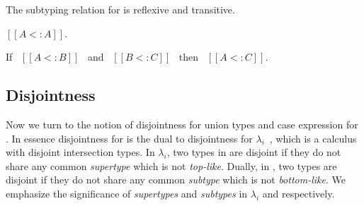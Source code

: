 The subtyping relation for \cal is reflexive and transitive.
\begin{lemma}
  $[[A <: A]]$.
\label{lemma:union:refl}
\end{lemma}
\begin{comment}
\begin{proof}
  By induction on type A. All cases are trivial to prove.
\end{proof}
\end{comment}
\begin{lemma}
  If \ $[[A <: B]]$ \ and \ $[[B <: C]]$ \ then \ $[[A <: C]]$.
  \label{lemma:union:trans}
\end{lemma}
\begin{comment}
\begin{proof}
  By induction on type B.
  \begin{itemize}
    \item Cases $[[Top]]$, $[[Bot]]$ and $[[Int]]$ are trivial to prove.
    \item Case $[[A -> B]]$ requires double induction on type $[[C]]$
          and $[[A]]$.
    \item Case $[[A \/ B]]$ requires \Cref{lemma:union:sub-or}
  \end{itemize}
\end{proof}\bruno{If space is a concern we can probably drop the lemma statements
for reflexivity and transitivity as these are quite standard.}

\begin{lemma}[Subtyping Union Inversion]
\label{lemma:union:sub-or}
  If \ $[[A \/ B <: C]]$ then:
  \begin{enumerate}
    \item $[[A <: C]]$ and
    \item $[[B <: C]]$
  \end{enumerate}
\end{lemma}
\end{comment}


\subsection{Disjointness}
\label{sec:union:disj}
Now we turn to the notion of disjointness for
union types and case expression for \cal. In essence disjointness for \cal is
the dual to disjointness for $\lambda_i$~\cite{oliveira2016disjoint}, which is
a calculus with disjoint intersection types. In $\lambda_i$, two
types in are disjoint if they do not share any common
\emph{supertype} which is not \emph{top-like}. Dually, in
\cal, two types are disjoint if they do not share any common \emph{subtype} which
is not \emph{bottom-like}.
We emphasize the significance of
\emph{supertypes} and \emph{subtypes} in $\lambda_i$ and \cal
respectively.

